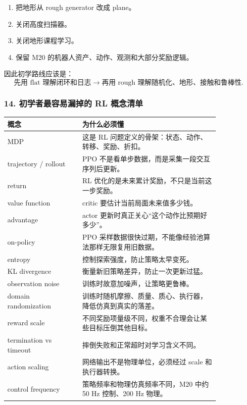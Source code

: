 \documentclass[UTF8,11pt,a4paper]{ctexart}
\begin{document}
\begin{enumerate}
  \item 把地形从 rough generator 改成 plane。
  \item 关闭高度扫描器。
  \item 关闭地形课程学习。
  \item 保留 M20 的机器人资产、动作、观测和大部分奖励逻辑。
\end{enumerate}

因此初学路线应该是：
\[
\boxed{
\text{先用 flat 理解闭环和日志}
\rightarrow
\text{再用 rough 理解随机化、地形、接触和鲁棒性}.
}
\]

\subsubsection{14. 初学者最容易漏掉的 RL 概念清单}

\begin{center}
\renewcommand{\arraystretch}{1.25}
\begin{tabular}{p{0.30\linewidth}p{0.55\linewidth}}
\toprule
\textbf{概念} & \textbf{为什么必须懂}\\
\midrule
MDP & 这是 RL 问题定义的骨架：状态、动作、转移、奖励、折扣。\\
trajectory / rollout & PPO 不是看单步数据，而是采集一段交互序列后更新。\\
return & RL 优化的是未来累计奖励，不只是当前这一步奖励。\\
value function & critic 要估计当前局面未来值多少钱。\\
advantage & actor 更新时真正关心“这个动作比预期好多少”。\\
on-policy & PPO 采样数据很快过期，不能像经验池算法那样无限复用旧数据。\\
entropy & 控制探索强度，防止策略太早变死。\\
KL divergence & 衡量新旧策略差异，防止一次更新过猛。\\
observation noise & 训练时故意加噪声，让策略更鲁棒。\\
domain randomization & 训练时随机摩擦、质量、质心、执行器，降低仿真到真实的落差。\\
reward scale & 不同奖励项量级不同，权重不合理会让某些目标压倒其他目标。\\
termination vs timeout & 摔倒失败和正常超时对学习含义不同。\\
action scaling & 网络输出不是物理单位，必须经过 scale 和执行器转换。\\
control frequency & 策略频率和物理仿真频率不同，M20 中约 50 Hz 控制、200 Hz 物理。\\
\bottomrule
\end{tabular}
\end{center}
\end{document}

